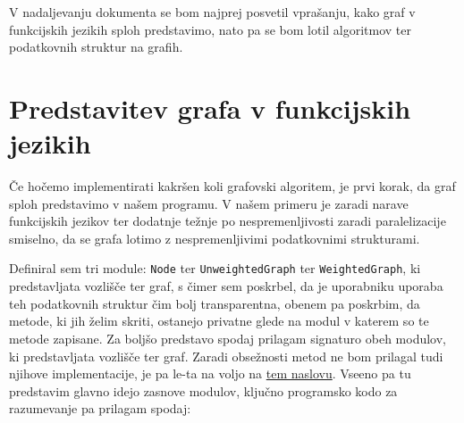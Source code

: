 \documentclass[mat1, tisk]{fmfdelo}
\begin{document}
V nadaljevanju dokumenta se bom najprej posvetil vprašanju, kako graf v funkcijskih jezikih sploh predstavimo, 
nato pa se bom lotil algoritmov ter podatkovnih struktur na grafih.


\section{Predstavitev grafa v funkcijskih jezikih}

Če hočemo implementirati kakršen koli grafovski algoritem, je prvi korak, da graf sploh predstavimo v našem programu.
V našem primeru je zaradi narave funkcijskih jezikov ter dodatnje težnje po nespremenljivosti zaradi paralelizacije
smiselno, da se grafa lotimo z nespremenljivimi podatkovnimi strukturami.

Definiral sem tri module: \texttt{Node} ter \texttt{UnweightedGraph} ter \texttt{WeightedGraph}, ki predstavljata 
vozlišče ter graf, s čimer sem poskrbel, da je uporabniku uporaba teh podatkovnih struktur čim bolj transparentna, 
obenem pa poskrbim, da metode, ki jih želim skriti, ostanejo privatne glede na modul v katerem so te metode zapisane.
Za boljšo predstavo spodaj prilagam signaturo obeh modulov, ki predstavljata vozlišče ter graf. Zaradi obsežnosti metod
ne bom prilagal tudi njihove implementacije, je pa le-ta na voljo na 
\href{https://github.com/tjazerzen/parallelisation-of-graph-algorithms-in-functional-programming-languages/blob/master/playground/graph/graph.ml}{tem naslovu}.
Vseeno pa tu predstavim glavno idejo zasnove modulov, ključno programsko kodo za razumevanje pa prilagam spodaj:
\end{document}
